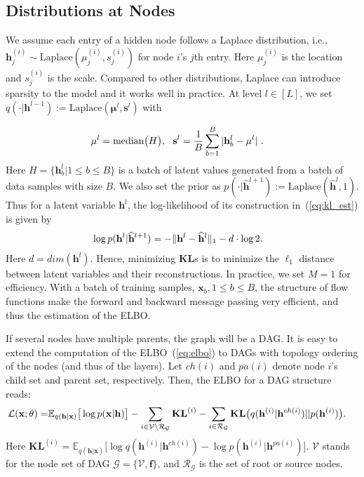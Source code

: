 \documentclass{article}
\begin{document}
\subsection{Distributions at Nodes}
 We assume each entry of a hidden node follows a Laplace distribution, i.e., $\mathbf{h}_j^{(i)} \sim \text{Laplace}(\mu_j^{(i)}, s_j^{(i)})$ for node $i$'s $j$th entry. Here $\mu_j^{(i)}$ is the location and $s_j^{(i)}$ is the scale. Compared to other distributions, Laplace can introduce sparsity to the model and it works well in practice. At level $l \in [L]$, we set $q(\cdot|\mathbf{h}^{l-1}) := \text{Laplace}(\mathbf{\mu}^l, \mathbf{s}^l)$ with
 
 \begin{align} \notag
&\mathbf{\mu}^l = \text{median}\big(H\big), \ \  \mathbf{s}^l =\frac{1}{B}\sum_{b=1}^B|\mathbf{h}_b^l - \mathbf{\mu}^l| \ .
\end{align}
Here $H=\{\mathbf{h}^l_b| 1\leqslant b \leqslant B\}$ is a batch of latent values generated from a batch of data samples with size $B$. 
We also set the prior as $p(\cdot | \widehat{\mathbf{h}}^{l+1}):=\text{Laplace}(\widehat{\mathbf{h}}^l, 1)$. Thus for a latent variable $\mathbf{h}^l$, the log-likelihood of its construction in~(\ref{eq:kl_est}) is given by 
\begin{align} \notag
& \log p(\mathbf{h}^l | \widehat{\mathbf{h}}^{l+1}) = -\|\mathbf{h}^l- \widehat{\mathbf{h}}^l\|_1 -d\cdot\log2  .
\end{align}
Here $d = dim(\mathbf{h}^l)$. Hence, minimizing  $\mathbf{KL}$s is to minimize the $\ell_1$ distance between latent variables and their reconstructions. In practice, we set $M=1$ for efficiency. With a batch of training samples, $\mathbf{x}_b, 1 \leqslant b \leqslant B$, the structure of flow functions make the  forward  and  backward message passing very efficient, and  thus the estimation of the ELBO.  

If several nodes have multiple parents, the graph will be a DAG. It is easy to extend the computation of the ELBO~(\ref{eq:elbo}) to DAGs with topology ordering of the nodes (and thus of the layers). 
Let $ch(i)$ and $pa(i)$ denote node $i$'s child set and parent set, respectively.
Then, the ELBO for a DAG structure reads:
\begin{align}\label{eq:elbo_dag_2}
\mathcal{L}(\mathbf{x}; \theta) =& \mathbb{E}_{q(\mathbf{h}|\mathbf{x})}\big[ \log p(\mathbf{x}|\mathbf{h})  \big] -  \sum_{i \in \mathcal{V}  \setminus  \mathcal{R}_{ \mathcal{G} }} \textbf{\text{KL}}^{(i)}   -    \sum_{i \in  \mathcal{R}_{ \mathcal{G} }  }  \textbf{\text{KL}}\big(q(\mathbf{h}^{(i)} | \mathbf{h}^{ch(i)} )   || p(\mathbf{h}^{(i)})  \big) .
\end{align}
Here $\mathbf{KL}^{(i)}=\mathbb{E}_{q(\mathbf{h}|\mathbf{x})}\big[  \log q(\mathbf{h}^{(i)}|\mathbf{h}^{ch(i)})   - \log p(\mathbf{h}^{(i)}|\mathbf{h}^{pa(i)}) \big]$. $\mathcal{V}$ stands for the node set of DAG $\mathcal{G} = \{\mathcal{V}, \mathbf{f}\}$, and $\mathcal{R}_{ \mathcal{G}}$ is the set of root or source nodes. 
 
\end{document}
